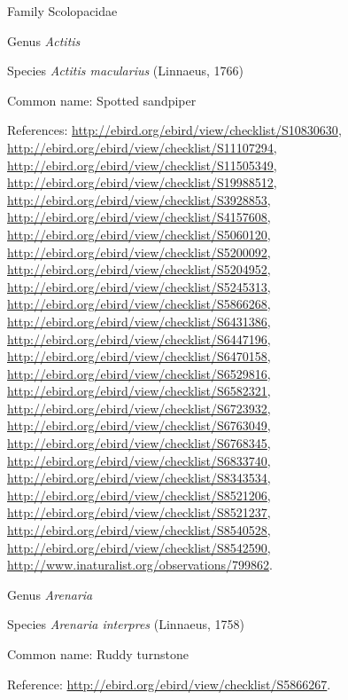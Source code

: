 \documentclass[9pt, article]{memoir}
\begin{document}
\begin{multicols}{2}
\vspace{6pt}\noindent\hspace{24pt}Family Scolopacidae


\vspace{6pt}\noindent\hspace{30pt}Genus \textit{Actitis}


\vspace{6pt}\noindent\hspace{36pt}Species \textit{Actitis macularius} (Linnaeus, 1766)


Common name: Spotted sandpiper

References: 
\url{http://ebird.org/ebird/view/checklist/S10830630}, 
\url{http://ebird.org/ebird/view/checklist/S11107294}, 
\url{http://ebird.org/ebird/view/checklist/S11505349}, 
\url{http://ebird.org/ebird/view/checklist/S19988512}, 
\url{http://ebird.org/ebird/view/checklist/S3928853}, 
\url{http://ebird.org/ebird/view/checklist/S4157608}, 
\url{http://ebird.org/ebird/view/checklist/S5060120}, 
\url{http://ebird.org/ebird/view/checklist/S5200092}, 
\url{http://ebird.org/ebird/view/checklist/S5204952}, 
\url{http://ebird.org/ebird/view/checklist/S5245313}, 
\url{http://ebird.org/ebird/view/checklist/S5866268}, 
\url{http://ebird.org/ebird/view/checklist/S6431386}, 
\url{http://ebird.org/ebird/view/checklist/S6447196}, 
\url{http://ebird.org/ebird/view/checklist/S6470158}, 
\url{http://ebird.org/ebird/view/checklist/S6529816}, 
\url{http://ebird.org/ebird/view/checklist/S6582321}, 
\url{http://ebird.org/ebird/view/checklist/S6723932}, 
\url{http://ebird.org/ebird/view/checklist/S6763049}, 
\url{http://ebird.org/ebird/view/checklist/S6768345}, 
\url{http://ebird.org/ebird/view/checklist/S6833740}, 
\url{http://ebird.org/ebird/view/checklist/S8343534}, 
\url{http://ebird.org/ebird/view/checklist/S8521206}, 
\url{http://ebird.org/ebird/view/checklist/S8521237}, 
\url{http://ebird.org/ebird/view/checklist/S8540528}, 
\url{http://ebird.org/ebird/view/checklist/S8542590}, 
\url{http://www.inaturalist.org/observations/799862}.

\vspace{6pt}\noindent\hspace{30pt}Genus \textit{Arenaria}


\vspace{6pt}\noindent\hspace{36pt}Species \textit{Arenaria interpres} (Linnaeus, 1758)


Common name: Ruddy turnstone

Reference: 
\url{http://ebird.org/ebird/view/checklist/S5866267}.


\end{multicols}
\end{document}
